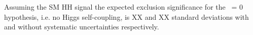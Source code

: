 Assuming the SM HH signal the expected exclusion significance for the \kl\ = 0 hypothesis, i.e. no Higgs self-coupling, is XX and XX standard deviations with and without systematic uncertainties respectively.










